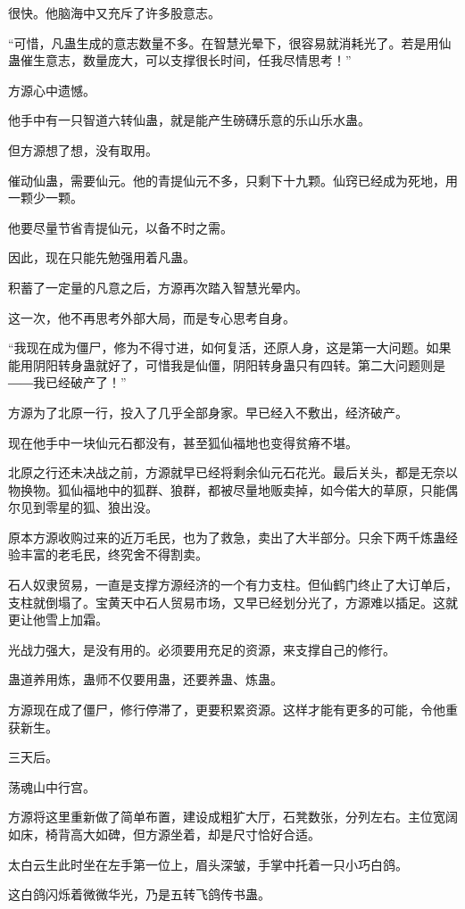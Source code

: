 \begin{this_body}
很快。他脑海中又充斥了许多股意志。

“可惜，凡蛊生成的意志数量不多。在智慧光晕下，很容易就消耗光了。若是用仙蛊催生意志，数量庞大，可以支撑很长时间，任我尽情思考！”

方源心中遗憾。

他手中有一只智道六转仙蛊，就是能产生磅礴乐意的乐山乐水蛊。

但方源想了想，没有取用。

催动仙蛊，需要仙元。他的青提仙元不多，只剩下十九颗。仙窍已经成为死地，用一颗少一颗。

他要尽量节省青提仙元，以备不时之需。

因此，现在只能先勉强用着凡蛊。

积蓄了一定量的凡意之后，方源再次踏入智慧光晕内。

这一次，他不再思考外部大局，而是专心思考自身。

“我现在成为僵尸，修为不得寸进，如何复活，还原人身，这是第一大问题。如果能用阴阳转身蛊就好了，可惜我是仙僵，阴阳转身蛊只有四转。第二大问题则是――我已经破产了！”

方源为了北原一行，投入了几乎全部身家。早已经入不敷出，经济破产。

现在他手中一块仙元石都没有，甚至狐仙福地也变得贫瘠不堪。

北原之行还未决战之前，方源就早已经将剩余仙元石花光。最后关头，都是无奈以物换物。狐仙福地中的狐群、狼群，都被尽量地贩卖掉，如今偌大的草原，只能偶尔见到零星的狐、狼出没。

原本方源收购过来的近万毛民，也为了救急，卖出了大半部分。只余下两千炼蛊经验丰富的老毛民，终究舍不得割卖。

石人奴隶贸易，一直是支撑方源经济的一个有力支柱。但仙鹤门终止了大订单后，支柱就倒塌了。宝黄天中石人贸易市场，又早已经划分光了，方源难以插足。这就更让他雪上加霜。

光战力强大，是没有用的。必须要用充足的资源，来支撑自己的修行。

蛊道养用炼，蛊师不仅要用蛊，还要养蛊、炼蛊。

方源现在成了僵尸，修行停滞了，更要积累资源。这样才能有更多的可能，令他重获新生。

三天后。

荡魂山中行宫。

方源将这里重新做了简单布置，建设成粗犷大厅，石凳数张，分列左右。主位宽阔如床，椅背高大如碑，但方源坐着，却是尺寸恰好合适。

太白云生此时坐在左手第一位上，眉头深皱，手掌中托着一只小巧白鸽。

这白鸽闪烁着微微华光，乃是五转飞鸽传书蛊。


\end{this_body}
